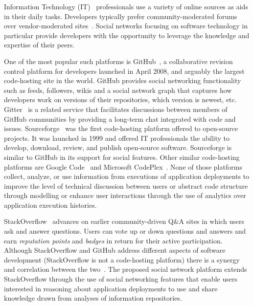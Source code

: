 Information Technology (IT)~\cite{jorgenson1999information} professionals use a variety of online sources as aids in their daily tasks. Developers typically prefer community-moderated forums over vendor-moderated sites~\cite{evans-date}. Social networks focusing on software technology in particular provide developers with the opportunity to leverage the knowledge and expertise of their peers.
 
One of the most popular such platforms is GitHub~\cite{github_url}, a collaborative revision control platform for developers launched in April 2008, and arguably the largest code-hosting site in the world. 
GitHub provides social networking functionality such as feeds, followers, wikis and a social network graph that captures how developers work on versions of their repositories, which version is newest, etc.
Gitter~\cite{gitter} is a related service that facilitates discussions between members of GitHub communities by providing a long-term chat integrated with code and issues.
Sourceforge~\cite{sourceforge} was the first code-hosting platform offered to open-source projects. It was launched in 1999 and offered IT professionals the ability to develop, download, review, and publish open-source software. Sourceforge is similar to GitHub in its support for social features.
Other similar code-hosting platforms are Google Code~\cite{googlecode} and Microsoft CodePlex~\cite{codeplex}.
None of those platforms collect, analyze, or use information from executions of application deployments to improve the level of technical discussion between users or abstract code structure through modelling or enhance user interactions through the use of analytics over application execution histories.

StackOverflow~\cite{stackoverflow} advances on earlier community-driven Q\&A sites in which users ask and answer questions. Users can vote up or down questions and answers and earn \emph{reputation points} and \emph{badges} in return for their active participation. 
Although StackOverflow and GitHub address different aspects of software development (StackOverflow is not a code-hosting platform) there is a synergy and correlation between the two~\cite{stackgit}. The proposed social network platform extends StackOverflow through the use of social networking features that enable users interested in reasoning about application deployments to use and share knowledge drawn from analyses of information repositories.

